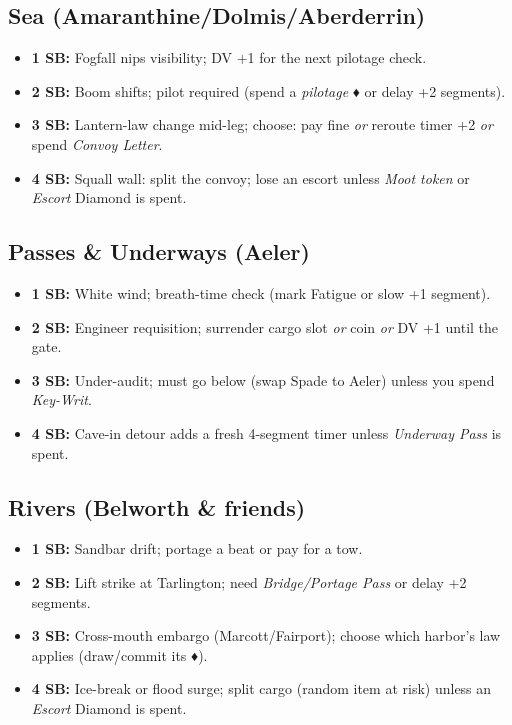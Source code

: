 \documentclass[12pt,oneside]{book}
\renewcommand{\diamondsuit}{♦}
\begin{document}
\subsection{Sea (Amaranthine/Dolmis/Aberderrin)}
\begin{itemize}
  \item \textbf{1 SB:} Fogfall nips visibility; DV +1 for the next pilotage check.
  \item \textbf{2 SB:} Boom shifts; pilot required (spend a \emph{pilotage} \diamondsuit{} or delay +2 segments).
  \item \textbf{3 SB:} Lantern-law change mid-leg; choose: pay fine \emph{or} reroute timer +2 \emph{or} spend \emph{Convoy Letter}.
  \item \textbf{4 SB:} Squall wall: split the convoy; lose an escort unless \emph{Moot token} or \emph{Escort} Diamond is spent.
\end{itemize}

\subsection{Passes \& Underways (Aeler)}
\begin{itemize}
  \item \textbf{1 SB:} White wind; breath-time check (mark Fatigue or slow +1 segment).
  \item \textbf{2 SB:} Engineer requisition; surrender cargo slot \emph{or} coin \emph{or} DV +1 until the gate.
  \item \textbf{3 SB:} Under-audit; must go below (swap Spade to Aeler) unless you spend \emph{Key-Writ}.
  \item \textbf{4 SB:} Cave-in detour adds a fresh 4-segment timer unless \emph{Underway Pass} is spent.
\end{itemize}

\subsection{Rivers (Belworth \& friends)}
\begin{itemize}
  \item \textbf{1 SB:} Sandbar drift; portage a beat or pay for a tow.
  \item \textbf{2 SB:} Lift strike at Tarlington; need \emph{Bridge/Portage Pass} or delay +2 segments.
  \item \textbf{3 SB:} Cross-mouth embargo (Marcott/Fairport); choose which harbor's law applies (draw/commit its \diamondsuit).
  \item \textbf{4 SB:} Ice-break or flood surge; split cargo (random item at risk) unless an \emph{Escort} Diamond is spent.
\end{itemize}
\end{document}

